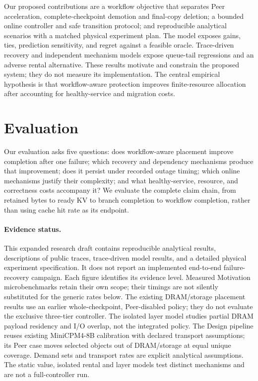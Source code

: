 \documentclass[sigplan,10pt,anonymous,nonacm]{acmart}
\begin{document}
Our proposed contributions are a workflow objective that separates Peer
acceleration, complete-checkpoint demotion and final-copy deletion; a bounded online controller and safe transition
protocol; and reproducible analytical scenarios with a matched physical
experiment plan. The model exposes gains, ties, prediction sensitivity,
and regret against a feasible oracle. Trace-driven recovery and independent
mechanism models expose queue-tail regressions and an adverse rental
alternative. These results
motivate and constrain the proposed
system; they do not measure its implementation. The central empirical
hypothesis is that workflow-aware protection improves finite-resource
allocation after accounting for healthy-service and migration costs.




\section{Evaluation}
\label{sec:evaluation}

Our evaluation asks five questions: does workflow-aware placement improve
completion after one failure; which recovery and dependency mechanisms
produce that improvement; does it persist under recorded outage timing;
which online mechanisms justify their complexity; and what healthy-service,
resource, and correctness costs accompany it? We evaluate the complete
claim chain, from retained bytes to ready KV to branch completion to
workflow completion, rather than using cache hit rate as its endpoint.

\paragraph{Evidence status.}
This expanded research draft contains reproducible analytical results,
descriptions of public traces, trace-driven model results, and a detailed
physical experiment specification. It does not report an implemented
end-to-end failure-recovery campaign. Each figure identifies its evidence
level. Measured Motivation microbenchmarks retain their own scope;
their timings are not silently substituted for the generic rates below.
The existing DRAM/storage placement results use an earlier whole-checkpoint,
Peer-disabled policy; they do not evaluate the exclusive three-tier
controller. The isolated layer model studies partial DRAM payload
residency and I/O overlap, not the integrated policy. The Design pipeline
reuses existing MiniCPM4-8B calibration with declared transport assumptions;
its Peer case moves selected objects out of DRAM/storage at equal unique
coverage. Demand sets and transport rates are explicit analytical assumptions.
The static value, isolated rental and layer models test distinct mechanisms
and are not a full-controller run.
\end{document}
